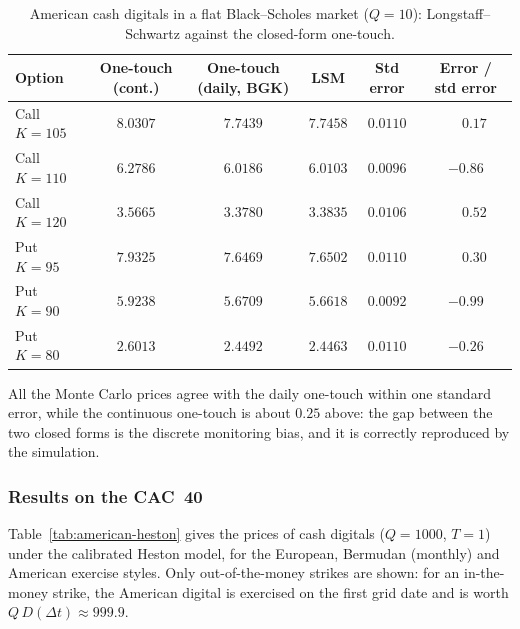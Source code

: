 \documentclass[11pt,a4paper]{article}
\theoremstyle{remark}
\begin{document}
\begin{table}[htbp]
\centering
\small
\setlength{\tabcolsep}{4pt}
\begin{tabular}{lccccc}
\toprule
Option & One-touch (cont.) & One-touch (daily, BGK) & LSM & Std error & Error / std error \\
\midrule
Call $K=105$ & $8.0307$ & $7.7439$ & $7.7458$ & $0.0110$ & $\phantom{-}0.17$ \\
Call $K=110$ & $6.2786$ & $6.0186$ & $6.0103$ & $0.0096$ & $-0.86$ \\
Call $K=120$ & $3.5665$ & $3.3780$ & $3.3835$ & $0.0106$ & $\phantom{-}0.52$ \\
Put $K=95$   & $7.9325$ & $7.6469$ & $7.6502$ & $0.0110$ & $\phantom{-}0.30$ \\
Put $K=90$   & $5.9238$ & $5.6709$ & $5.6618$ & $0.0092$ & $-0.99$ \\
Put $K=80$   & $2.6013$ & $2.4492$ & $2.4463$ & $0.0110$ & $-0.26$ \\
\bottomrule
\end{tabular}
\caption{American cash digitals in a flat Black--Scholes market ($Q = 10$):
Longstaff--Schwartz against the closed-form one-touch.}
\label{tab:american-bs}
\end{table}

All the Monte Carlo prices agree with the daily one-touch within one standard
error, while the continuous one-touch is about $0.25$ above: the gap between
the two closed forms is the discrete monitoring bias, and it is correctly
reproduced by the simulation.

\subsubsection{Results on the CAC~40}

Table~\ref{tab:american-heston} gives the prices of cash digitals
($Q = 1000$, $T = 1$) under the calibrated Heston model, for the European,
Bermudan (monthly) and American exercise styles. Only out-of-the-money strikes
are shown: for an in-the-money strike, the American digital is exercised on
the first grid date and is worth $Q\,D(\Delta t) \approx 999.9$.
\end{document}
